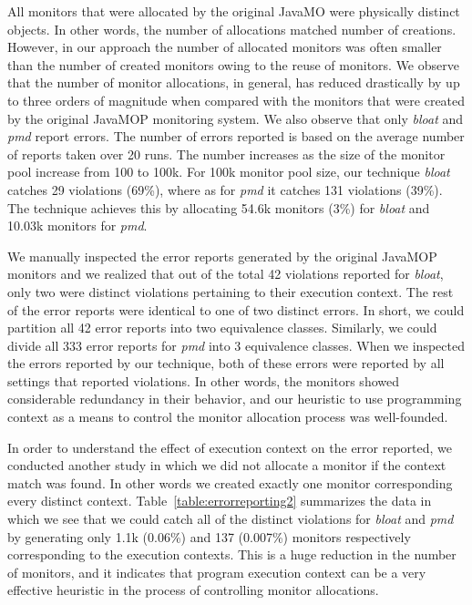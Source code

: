 All monitors that were allocated by the original JavaMO were physically distinct objects. In other words, the number of allocations matched number of creations. However, in our approach the number of allocated monitors was often smaller than the number of created monitors owing to the reuse of monitors. We observe that the number of monitor allocations, in general, has reduced drastically by up to three orders of magnitude when compared with the monitors that were created by the original JavaMOP monitoring system. We also observe that only \textit{bloat} and \textit{pmd} report errors. The number of errors reported is based on the average number of reports taken over 20 runs. The number increases as the size of the monitor pool increase from 100 to 100k. For 100k monitor pool size, our technique \textit{bloat} catches 29 violations (69\%), where as for \textit{pmd} it catches 131 violations (39\%). The technique achieves this by allocating 54.6k monitors (3\%) for \textit{bloat} and 10.03k monitors for \textit{pmd}.

We manually inspected the error reports generated by the original JavaMOP monitors and we realized that out of the total 42 violations reported for \textit{bloat}, only two were distinct violations pertaining to their execution context. The rest of the error reports were identical to one of two distinct errors. In short, we could partition all 42 error reports into two equivalence classes. Similarly, we could divide all 333 error reports for \textit{pmd} into 3 equivalence classes. When we inspected the errors reported by our technique, both of these errors were reported by all settings that reported violations. In other words, the monitors showed considerable redundancy in their behavior, and our heuristic to use programming context as a means to control the monitor allocation process was well-founded.

In order to understand the effect of execution context on the error reported, we conducted another study in which we did not allocate a monitor if the context match was found. In other words we created exactly one monitor corresponding every distinct context. Table~\ref{table:errorreporting2} summarizes the data in which we see that we could catch all of the distinct violations for \textit{bloat} and \textit{pmd} by generating only 1.1k (0.06\%) and 137 (0.007\%) monitors respectively corresponding to the execution contexts. This is a huge reduction in the number of monitors, and it indicates that program execution context can be a very effective heuristic in the process of controlling monitor allocations.

